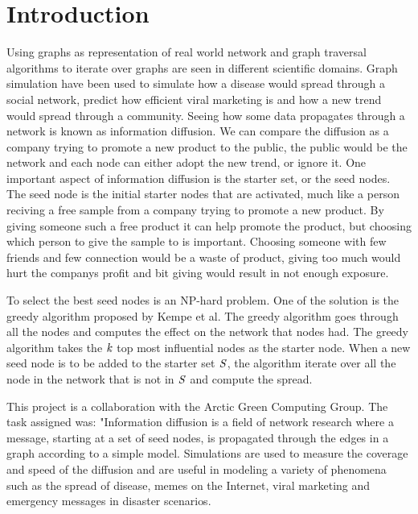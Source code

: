 \chapter{Introduction} 

Using graphs as representation of real world network and graph traversal algorithms to iterate over graphs are seen in different scientific domains\cite{HybridBFS2015}. Graph simulation have been used to simulate how a disease would spread through a social network\cite{DiseasOutbreak}, predict how efficient viral marketing is and how a new trend would spread through a community\cite{MaximizeSpread2003}. Seeing how some data propagates through a network is known as information diffusion. We can compare the diffusion as a company trying to promote a new product to the public, the public would be the network and each node can either adopt the new trend, or ignore it. One important aspect of information diffusion is the starter set, or the seed nodes. The seed node is the initial starter nodes that are activated, much like a person reciving a free sample from a company trying to promote a new product. By giving someone such a free product it can help promote the product, but choosing which person to give the sample to is important. Choosing someone with few friends and few connection would be a waste of product, giving too much would hurt the companys profit and bit giving would result in not enough exposure.

To select the best seed nodes is an NP-hard problem\cite{MaximizeSpread2003}. One of the solution is the greedy algorithm\cite{MaximizeSpread2015} proposed by Kempe et al. The greedy algorithm goes through all the nodes and computes the effect on the network that nodes had. The greedy algorithm takes the $\it{k}$ top most influential nodes as the starter node. When a new seed node is to be added to the starter set $\it{S}$, the algorithm iterate over all the node in the network that is not in $\it{S}$ and compute the spread.

This project is a collaboration with the Arctic Green Computing Group. The task assigned was:
"Information diffusion is a field of network research where a message, starting at a set of seed nodes, is propagated through the edges in a graph according to a simple model. Simulations are used to measure the coverage and speed of the diffusion and are useful in modeling a variety of phenomena such as the spread of disease, memes on the Internet, viral marketing and emergency messages in disaster scenarios.

